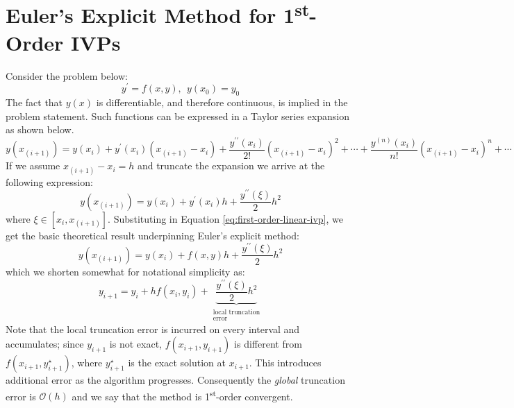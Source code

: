\section{Euler's Explicit Method for 1\textsuperscript{st}-Order IVPs}

Consider the problem below:
\begin{equation}
y^{\prime} = f(x,y), \ \ y(x_0) = y_0
\label{eq:first-order-linear-ivp}
\end{equation}
The fact that $y(x)$ is differentiable, and therefore continuous, is implied in the problem statement.  Such functions can be expressed in a Taylor series expansion as shown below.
\begin{equation*}
y(x_{(i+1)}) = y(x_{i}) + y^{\prime}(x_i)(x_{(i+1)}-x_i) + \frac{y^{\prime \prime}(x_{i})}{2!}(x_{(i+1)}-x_i)^2 + \cdots + \frac{y^{(n)}(x_i)}{n!}(x_{(i+1)}-x_i)^n + \cdots
\end{equation*}
If we assume $x_{(i+1)}-x_i = h$ and truncate the expansion we arrive at the following expression:
\begin{equation*}
y(x_{(i+1)}) = y(x_{i}) + y^{\prime}(x_i)h + \frac{y^{\prime \prime}(\xi)}{2}h^2
\end{equation*}
where $\xi \in [x_{i}, x_{(i+1)}]$.  Substituting in Equation \ref{eq:first-order-linear-ivp}, we get the basic theoretical result underpinning Euler's explicit method:
\begin{equation*}
y(x_{(i+1)}) = y(x_i)+f(x,y)h + \frac{y^{\prime \prime}(\xi)}{2}h^2
\end{equation*}
which we shorten somewhat for notational simplicity as:
\begin{equation}
y_{i+1} = y_i + hf(x_i,y_i) + \underbrace{\frac{y^{\prime \prime}(\xi)}{2}h^2}_{\substack{\text{local truncation} \\ \text{error}}}
\end{equation}
Note that the local truncation error is incurred on every interval and accumulates; since $y_{i+1}$ is not exact, $f(x_{i+1},y_{i+1})$ is different from $f(x_{i+1},y^{\star}_{i+1})$, where $y^{\star}_{i+1}$ is the exact solution at $x_{i+1}$.  This introduces additional error as the algorithm progresses. Consequently the \emph{global} truncation error is $\mathcal{O}(h)$ and we say that the method is 1\textsuperscript{st}-order convergent.

\vspace{0.2cm}

